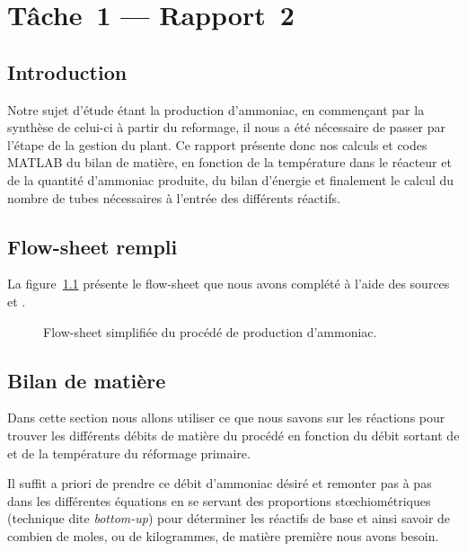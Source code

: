 \chapter{Tâche~1 --- Rapport~2}

\section{Introduction}

Notre sujet d'étude étant la production d’ammoniac, en commençant par la synthèse de celui-ci à partir du reformage, il nous a été nécessaire de passer par l’étape de la gestion du plant. Ce rapport présente donc nos calculs et codes MATLAB du bilan de matière, en fonction de la température dans le réacteur et de la quantité d’ammoniac produite, du bilan d’énergie et finalement le calcul du nombre de tubes nécessaires à l’entrée des différents réactifs. 

\section{Flow-sheet rempli}

La figure~\ref{fig:flowsheet2} présente le flow-sheet que nous avons complété à l'aide des sources \cite{epa} et \cite{process-patent}.

\begin{figure}
    \centering
    
    \caption{Flow-sheet simplifiée du procédé de production d'ammoniac.}
    \label{fig:flowsheet2}
\end{figure}
%    

\section{Bilan de matière}

Dans cette section nous allons utiliser ce que nous savons
sur les réactions pour trouver les différents débits de matière du procédé
en fonction du débit sortant de 
et de la température du réformage primaire.

Il suffit a priori de prendre ce débit
d’ammoniac désiré et remonter pas à pas
dans les différentes équations en se servant des proportions stœchiométriques
(technique dite \emph{bottom-up})
pour déterminer les réactifs de base
et ainsi savoir de combien de moles, ou de kilogrammes, de matière première
nous avons besoin.

